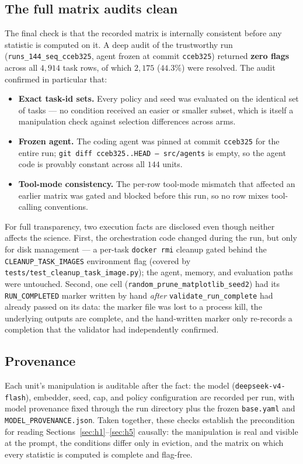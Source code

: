 \subsection{The full matrix audits clean}

The final check is that the recorded matrix is internally consistent before any
statistic is computed on it. A deep audit of the trustworthy run
(\texttt{runs\_144\_seq\_cceb325}, agent frozen at commit \texttt{cceb325}) returned
\textbf{zero flags} across all $4{,}914$ task rows, of which $2{,}175$ ($44.3\%$) were
resolved. The audit confirmed in particular that:

\begin{itemize}
  \item \textbf{Exact task-id sets.} Every policy and seed was evaluated on the
        identical set of tasks --- no condition received an easier or smaller subset,
        which is itself a manipulation check against selection differences across
        arms.
  \item \textbf{Frozen agent.} The coding agent was pinned at commit
        \texttt{cceb325} for the entire run; \texttt{git diff cceb325..HEAD --
        src/agents} is empty, so the agent code is provably constant across all $144$
        units.
  \item \textbf{Tool-mode consistency.} The per-row tool-mode mismatch that affected
        an earlier matrix was gated and blocked before this run, so no row mixes
        tool-calling conventions.
\end{itemize}

For full transparency, two execution facts are disclosed even though neither affects
the science. First, the orchestration code changed during the run, but only for
disk management --- a per-task \texttt{docker rmi} cleanup gated behind the
\texttt{CLEANUP\_TASK\_IMAGES} environment flag (covered by
\texttt{tests/test\_cleanup\_task\_image.py}); the agent, memory, and evaluation paths
were untouched. Second, one cell (\texttt{random\_prune\_matplotlib\_seed2}) had its
\texttt{RUN\_COMPLETED} marker written by hand \emph{after}
\texttt{validate\_run\_complete} had already passed on its data: the marker file was
lost to a process kill, the underlying outputs are complete, and the hand-written
marker only re-records a completion that the validator had independently confirmed.

\subsection{Provenance}

Each unit's manipulation is auditable after the fact: the model
(\texttt{deepseek-v4-flash}), embedder, seed, cap, and policy configuration are
recorded per run, with model provenance fixed through the run directory plus the
frozen \texttt{base.yaml} and \texttt{MODEL\_PROVENANCE.json}. Taken together, these
checks establish the precondition for reading Sections~\ref{sec:h1}--\ref{sec:h5}
causally: the manipulation is real and visible at the prompt, the conditions differ
only in eviction, and the matrix on which every statistic is computed is complete and
flag-free.

